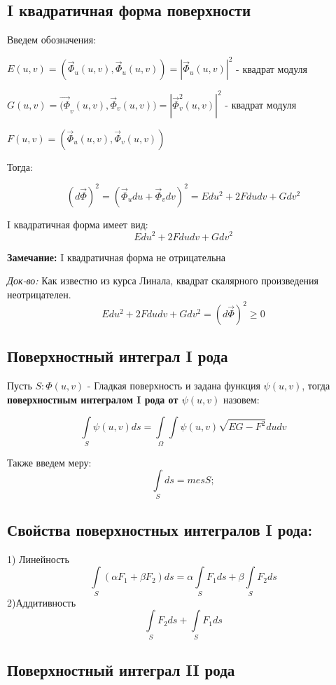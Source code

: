 \documentclass[12pt]{article}
\begin{document}
\newpage
\subsection{I квадратичная форма поверхности}
	
	Введем обозначения:
		
	$E(u , v) = (\vec{\Phi}_u(u , v) , \vec{\Phi}_u( u, v)) = |\vec{\Phi}_u( u, v)|^2$ - квадрат модуля
	
	$G(u , v) = \vec{(\Phi}_v(u , v) , \vec{\Phi}_v( u, v)) = |\vec{\Phi}_v^2( u, v)|^2$ - квадрат модуля
	
	$F(u , v) = (\vec{\Phi}_u(u , v) , \vec{\Phi}_v( u, v))$ 
	
	Тогда:
	
	$$(d\vec{\Phi})^2 = (\vec{\Phi}_u du + \vec{\Phi}_v dv)^2 = Edu^2 + 2Fdudv + Gdv^2$$
	
	I квадратичная форма имеет вид:
	$$Edu^2 + 2Fdudv + Gdv^2$$			
	
\textbf{Замечание:}
	I квадратичная форма не отрицательна
	
\textit{Док-во:}
Как известно из курса Линала, квадрат скалярного произведения неотрицателен.
	$$Edu^2 + 2Fdudv + Gdv^2 = (d\vec{\Phi})^2 \geqslant 0$$
	
\subsection{Поверхностный интеграл I рода}
	Пусть $S : \Phi(u , v)$ - Гладкая поверхность и задана функция $\psi(u , v)$, тогда \textbf{поверхностным интегралом I рода от $\psi(u,v)$} назовем:
	
$$
\int\limits_{S} \psi(u , v) ds 
=
\int\limits_{\Omega}\int \psi(u,v)\sqrt{EG - F^2}dudv	
$$		
	
	Также введем меру:
$$
	\int\limits_{S}ds = mesS;
$$	
	
\subsection{Свойства поверхностных интегралов I рода:}
	1) Линейность
$$
\int\limits_{S} (\alpha F_1 + \beta F_2)ds
=
\alpha\int\limits_{S}  F_1ds
+
\beta\int\limits_{S}  F_2ds
$$
	2)Аддитивность	
$$
\int\limits_{S}  F_2ds
+
\int\limits_{S}  F_1ds
$$



\subsection{Поверхностный интеграл II рода}
\end{document}
